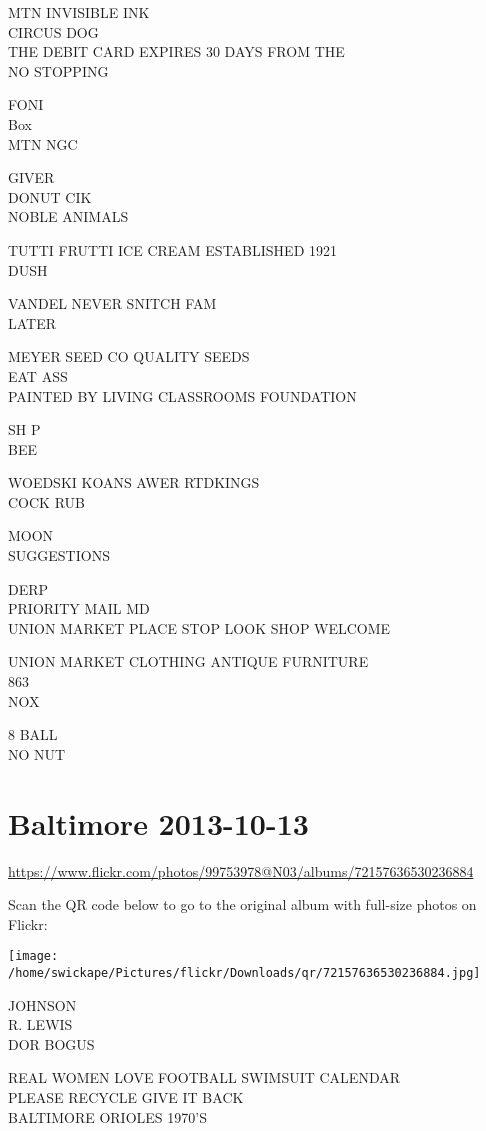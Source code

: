 \documentclass[10pt,letterpaper]{article}
\begin{document}
MTN INVISIBLE INK\\
CIRCUS DOG\\
THE DEBIT CARD EXPIRES 30 DAYS FROM THE\\
NO STOPPING

FONI\\
Box\\
MTN NGC

GIVER\\
DONUT CIK\\
NOBLE ANIMALS

TUTTI FRUTTI ICE CREAM ESTABLISHED 1921\\
DUSH

VANDEL NEVER SNITCH FAM\\
LATER

MEYER SEED CO QUALITY SEEDS\\
EAT ASS\\
PAINTED BY LIVING CLASSROOMS FOUNDATION

SH P\\
BEE

WOEDSKI KOANS AWER RTDKINGS\\
COCK RUB

MOON\\
SUGGESTIONS

DERP\\
PRIORITY MAIL MD\\
UNION MARKET PLACE STOP LOOK SHOP WELCOME

UNION MARKET CLOTHING ANTIQUE FURNITURE\\
863\\
NOX

8 BALL\\
NO NUT


\section*{Baltimore 2013-10-13}

\url{https://www.flickr.com/photos/99753978@N03/albums/72157636530236884}

Scan the QR code below to go to the original album with full-size photos on Flickr:

\texttt{[image: /home/swickape/Pictures/flickr/Downloads/qr/72157636530236884.jpg]}


JOHNSON\\
R. LEWIS\\
DOR BOGUS

REAL WOMEN LOVE FOOTBALL SWIMSUIT CALENDAR\\
PLEASE RECYCLE GIVE IT BACK\\
BALTIMORE ORIOLES 1970'S
\end{document}
